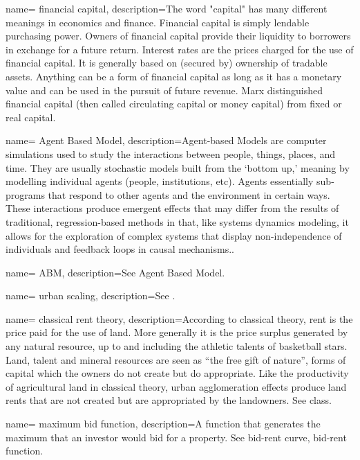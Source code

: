 {
name= financial capital,
description={The word "capital" has many different meanings in economics and finance. Financial capital is simply lendable purchasing power. Owners of financial capital provide their liquidity to borrowers in exchange for a future return. Interest rates are the prices charged for the use of financial capital. It is generally based on (secured by) ownership of tradable assets.  Anything can be a form of financial capital as long as it has a monetary value and can be  used in the pursuit of future revenue. Marx distinguished  financial capital (then called circulating capital or money capital) from fixed or real capital.   }
}


{
name= Agent Based Model,
description={Agent-based Models are computer simulations used to study the interactions between people, things, places, and time. They are usually stochastic models built from the `bottom up,' meaning by modelling individual agents (people, institutions, etc). Agents essentially sub-programs that respond to other agents and the environment in certain ways. These interactions produce emergent effects that may differ from the results of traditional, regression-based methods in that, like systems dynamics modeling, it allows for the exploration of complex systems that display non-independence of individuals and feedback loops in causal mechanisms..}
}


{
name= ABM,
description={See \gls{Agent Based Model}.}
}


{
name= urban scaling,
description={See \gls{}.}
}


{
name= classical rent theory,
description={According to classical theory, rent is the price paid for the use of land. More generally it is the price surplus generated by any natural resource, up to and including the athletic talents of basketball stars.\cite{lackmanClassicalBaseModern1976} Land, talent and mineral resources are seen as ``the free gift of nature'', forms of capital which the owners do not create but do appropriate. Like the productivity of agricultural land in classical theory,  urban \gls{agglomeration effects} produce land rents that are not created but are appropriated by the landowners. See \gls{class}.}
}


{
name= maximum bid function,
description={A function that generates the maximum that an investor would bid for a property.  See \gls{bid-rent curve}, \gls{bid-rent function}.}
}

